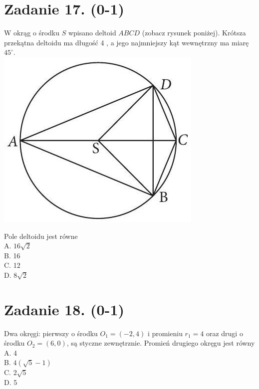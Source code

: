 \documentclass[10pt]{article}
\begin{document}
\section*{Zadanie 17. (0-1)}
W okrąg o środku \(S\) wpisano deltoid \(A B C D\) (zobacz rysunek poniżej). Krótsza przekątna deltoidu ma długość 4 , a jego najmniejszy kąt wewnętrzny ma miarę \(45^{\circ}\).\\
\includegraphics[max width=\textwidth, center]{2024_11_21_72158d4a4efa7dd894bcg-08}

Pole deltoidu jest równe\\
A. \(16 \sqrt{2}\)\\
B. 16\\
C. 12\\
D. \(8 \sqrt{2}\)

\section*{Zadanie 18. (0-1)}
Dwa okręgi: pierwszy o środku \(O_{1}=(-2,4)\) i promieniu \(r_{1}=4\) oraz drugi o środku \(O_{2}=(6,0)\), są styczne zewnętrznie. Promień drugiego okręgu jest równy\\
A. 4\\
B. \(4(\sqrt{5}-1)\)\\
C. \(2 \sqrt{5}\)\\
D. 5
\end{document}
